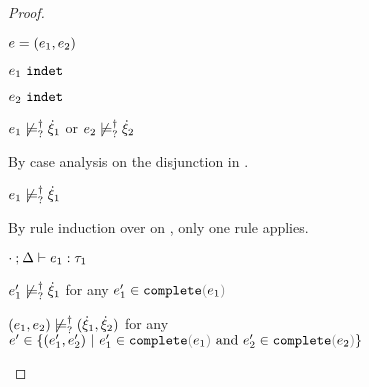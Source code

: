 \begin{proof}
\begin{byCases}
\begin{byCases}
\begin{byCases}
\begin{byCases}
\begin{pfsteps*}
          \end{pfsteps*} 
        \end{byCases}
      \end{byCases}
      \item[\text{(\ref{rule:IPair})}] 
      \begin{pfsteps*}
      \item $e=(e_1 , e_2)$ 
      \item $e_1 ~\mathtt{indet}$  
      \item $e_2 ~\mathtt{indet}$  
      \item $e_1 \not\models_{?}^{\dag} \dot{\xi}_1$ or $e_2 \not\models_{?}^{\dag} \dot{\xi}_2$  
      \end{pfsteps*}
      By case analysis on the disjunction in .
      \begin{byCases}
        \item[\cnotsatisfyormay{e_1}{\hxi_1}]
        \begin{pfsteps*}
        \item $e_1 \not\models_{?}^{\dag} \dot{\xi}_1$  
        \end{pfsteps*}
        By rule induction over  on , only one rule applies.
        \begin{byCases}
          \item[\text{(\ref{rule:TPair})}]
          \begin{pfsteps*}
          \item $\cdot \mathbin{;} \Delta \vdash e_1 : \tau_1$  
          \item $e_1' \not\models_{?}^{\dag} \dot{\xi}_1$ for any $e_1' \in \expcomplete{e_1}$  
          \item $(e_1 , e_2) \not\models_{?}^{\dag} (\dot{\xi}_1 , \dot{\xi}_2)$ for any $e' \in \{\hpair{e_1'}{e_2'} ~\vert~ e_1' \in \expcomplete{e_1} \textand e_2' \in \expcomplete{e_2}\}$ 
          \end{pfsteps*} 
        \end{byCases}

\end{byCases}
\end{byCases}
\end{byCases}
\end{proof}
